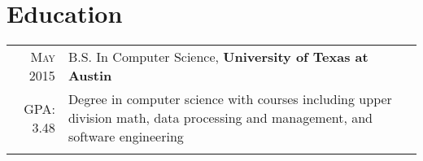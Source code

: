 \documentclass[a4paper,10pt]{article}
\begin{document}
\section{Education}
\begin{tabular}{rp{11cm}}
  \textsc{May} 2015 & B.S. In Computer Science, \textbf{University of Texas at Austin}\\
  \textsc{GPA}: 3.48 &
  \footnotesize{
    Degree in computer science with courses including upper division math,
    data processing and management, and software engineering
  }
  \\\multicolumn{2}{c}{} \\

\end{tabular}


\end{document}
